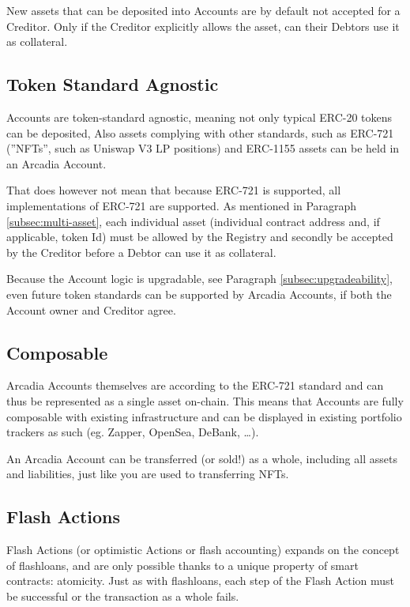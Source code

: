 \documentclass[sigconf,nonacm]{acmart}
\begin{document}
New assets that can be deposited into Accounts are by default not accepted for a Creditor.
Only if the Creditor explicitly allows the asset, can their Debtors use it as collateral.

\subsection{Token Standard Agnostic}
Accounts are token-standard agnostic, meaning not only typical ERC-20 tokens can be deposited,
Also assets complying with other standards, such as ERC-721 (”NFTs”, such as Uniswap V3 LP positions) and ERC-1155 assets can be held in an Arcadia Account.

That does however not mean that because ERC-721 is supported, all implementations of ERC-721 are supported.
As mentioned in Paragraph \ref{subsec:multi-asset}, each individual asset (individual contract address and, if applicable, token Id)
must be allowed by the Registry and secondly be accepted by the Creditor before a Debtor can use it as collateral.

Because the Account logic is upgradable, see Paragraph \ref{subsec:upgradeability}, even future token standards can be supported by Arcadia Accounts,
if both the Account owner and Creditor agree.

\subsection{Composable}
Arcadia Accounts themselves are according to the ERC-721 standard and can thus be represented as a single asset on-chain.
This means that Accounts are fully composable with existing infrastructure and can be displayed in existing portfolio trackers as such (eg. Zapper, OpenSea, DeBank, …).

An Arcadia Account can be transferred (or sold!) as a whole, including all assets and liabilities, just like you are used to transferring NFTs.

\subsection{Flash Actions}
Flash Actions (or optimistic Actions or flash accounting) expands on the concept of flashloans, and are only possible thanks to a unique property of smart contracts: atomicity\cite{xie2022towards}.
Just as with flashloans, each step of the Flash Action must be successful or the transaction as a whole fails.
\end{document}
